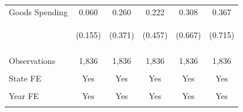 \documentclass[dv_diss_main.tex]{subfiles}
\begin{document}
\begin{table}[H]
\begin{center}
{\begin{tabular}{lccccc}
    Goods Spending & 0.060 & 0.260 & 0.222 & 0.308 & 0.367 \\
     & \begin{footnotesize}(0.155)\end{footnotesize} & \begin{footnotesize}(0.371)\end{footnotesize} & \begin{footnotesize}(0.457)\end{footnotesize} & \begin{footnotesize}(0.667)\end{footnotesize} & \begin{footnotesize}(0.715)\end{footnotesize} \\


    \vspace{4pt} & \begin{footnotesize}\end{footnotesize} & \begin{footnotesize}\end{footnotesize} & \begin{footnotesize}\end{footnotesize} & \begin{footnotesize}\end{footnotesize} & \begin{footnotesize}\end{footnotesize} \\
    Observations & 1,836 & 1,836 & 1,836 & 1,836 & 1,836 \\
    \vspace{-2pt} & \vspace{-2pt} & \vspace{-2pt} & \vspace{-2pt} & \vspace{-2pt} \\
    State FE & Yes & Yes & Yes & Yes & Yes \\
    \vspace{-2pt} & \vspace{-2pt} & \vspace{-2pt} & \vspace{-2pt} & \vspace{-2pt} \\
    Year FE & Yes & Yes & Yes & Yes & Yes \\
    \vspace{-2pt} & \vspace{-2pt} & \vspace{-2pt} & \vspace{-2pt} & \vspace{-2pt} \\

\end{tabular}}
\end{center}
\end{table}
\end{document}
